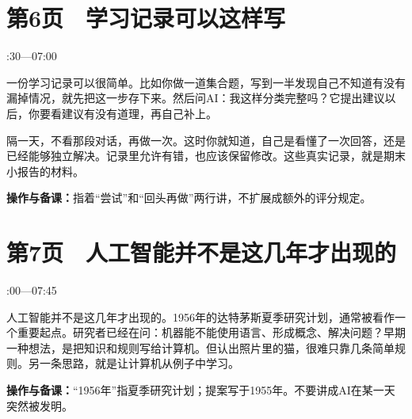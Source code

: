 \documentclass[UTF8,a4paper,11pt,fontset=fandol]{ctexart}
\newcommand{\tip}[1]{\par{\small\color{black!65}\noindent\textbf{操作与备课：}#1\par}}
\begin{document}
\par\noindent\begin{minipage}{\linewidth}

\section*{第6页　学习记录可以这样写}

{\small{}:30—07:00\par}

一份学习记录可以很简单。比如你做一道集合题，写到一半发现自己不知道有没有漏掉情况，就先把这一步存下来。然后问AI：我这样分类完整吗？它提出建议以后，你要看建议有没有道理，再自己补上。

隔一天，不看那段对话，再做一次。这时你就知道，自己是看懂了一次回答，还是已经能够独立解决。记录里允许有错，也应该保留修改。这些真实记录，就是期末小报告的材料。

\tip{指着“尝试”和“回头再做”两行讲，不扩展成额外的评分规定。}

\end{minipage}\par\vspace{2mm}

\par\vspace{4mm}

\par\noindent\begin{minipage}{\linewidth}

\section*{第7页　人工智能并不是这几年才出现的}

{\small{}:00—07:45\par}

人工智能并不是这几年才出现的。1956年的达特茅斯夏季研究计划，通常被看作一个重要起点。研究者已经在问：机器能不能使用语言、形成概念、解决问题？早期一种想法，是把知识和规则写给计算机。但认出照片里的猫，很难只靠几条简单规则。另一条思路，就是让计算机从例子中学习。

\tip{“1956年”指夏季研究计划；提案写于1955年。不要讲成AI在某一天突然被发明。}

\end{minipage}\par\vspace{2mm}
\end{document}
